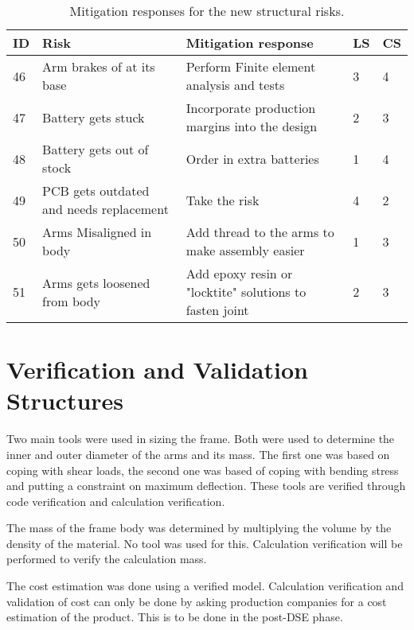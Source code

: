 \begin{table}[h]
\centering
\caption{Mitigation responses for the new structural risks.}
\label{tab:mitigationnewstructures}
\begin{scriptsize}
\begin{tabular}{|p{0.4cm}|p{3cm}|p{9.2cm}|p{0.4cm}|p{0.4cm}|} 
\hline
\multicolumn{1}{|l|}{\textbf{ID}} & \textbf{Risk}                                               & \textbf{Mitigation response}                                                                                                                                                               & \multicolumn{1}{l|}{\textbf{LS}} & \multicolumn{1}{l|}{\textbf{CS}} \\ \hline
46 & Arm brakes of at its base &Perform Finite element analysis and tests& 3&4 \\ \hline
47 & Battery gets stuck & Incorporate production margins into the design & 2&3\\\hline
48 & Battery gets out of stock& Order in extra batteries&1&4\\ \hline
49 & PCB gets outdated and needs replacement & Take the risk& 4&2 \\ \hline
50 & Arms Misaligned in body & Add  thread to the arms to make assembly easier & 1 & 3 \\ \hline
51 & Arms gets loosened from body & Add epoxy resin or "locktite" solutions to fasten joint & 2 & 3 \\ \hline
\end{tabular}
\end{scriptsize}
\end{table}

\section{Verification and Validation Structures} \label{sec:vervalstruc}
Two main tools were used in sizing the frame. Both were used to determine the inner and outer diameter of the arms and its mass. The first one was based on coping with shear loads, the second one was based of coping with bending stress and putting a constraint on maximum deflection. These tools are verified through code verification and calculation verification. 

The mass of the frame body was determined by multiplying the volume by the density of the material. No tool was used for this. Calculation verification will be performed to verify the calculation mass.

The cost estimation was done using a verified model\cite{materialbible}. Calculation verification and validation of cost can only be done by asking production companies for a cost estimation of the product. This is to be done in the post-DSE phase.


